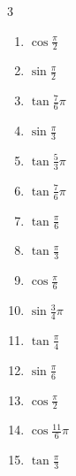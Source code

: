 \begin{multicols}{3}
\begin{enumerate}
  \item $\displaystyle \cos{\frac{\pi}{2}}$
        \phantom{$\displaystyle =0$}

  \item $\displaystyle \sin{\frac{\pi}{2}}$
        \phantom{$\displaystyle =1$}

  \item $\displaystyle \tan{\frac{7}{6}\pi}$

  \item $\displaystyle \sin{\frac{\pi}{3}}$

  \item $\displaystyle \tan{\frac{5}{3}\pi}$

  \item $\displaystyle \tan{\frac{7}{6}\pi}$

  \item $\displaystyle \tan{\frac{\pi}{6}}$

  \item $\displaystyle \tan{\frac{\pi}{3}}$

  \item $\displaystyle \cos{\frac{\pi}{6}}$

\columnbreak %

\resetques

  \item $\displaystyle \sin{\frac{3}{4}\pi}$

  \item $\displaystyle \tan{\frac{\pi}{4}}$
        \phantom{$\displaystyle =1$}

  \item $\displaystyle \sin{\frac{\pi}{6}}$

  \item $\displaystyle \cos{\frac{\pi}{2}}$
        \phantom{$\displaystyle =0$}

  \item $\displaystyle \cos{\frac{11}{6}\pi}$

  \item $\displaystyle \tan{\frac{\pi}{3}}$


\end{enumerate}
\end{multicols}
